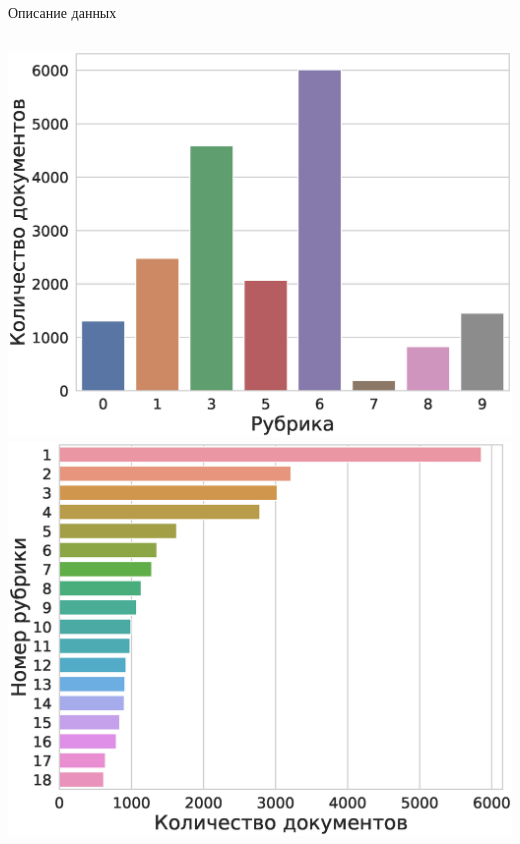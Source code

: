 \documentclass{beamer}
\begin{document}
\begin{frame}{Описание данных}
\begin{columns}[c]
\includegraphics[width=1.0\textwidth]{udk.eps}
\includegraphics[width=1.0\textwidth]{grnti.eps}
\end{columns}

\end{frame}
\end{document}
